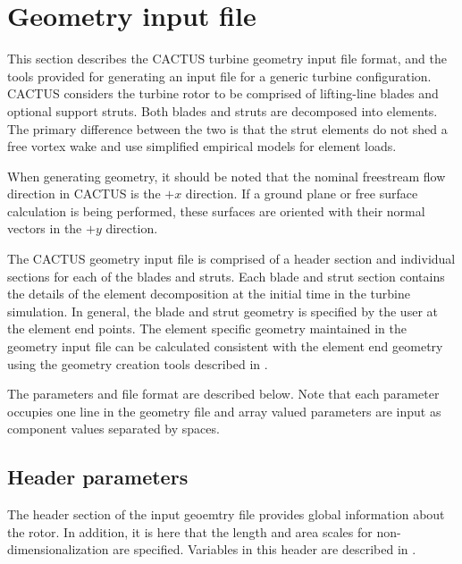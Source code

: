 \section{Geometry input file}
This section describes the CACTUS turbine geometry input file format, and the tools provided for generating an input file for a generic turbine configuration. CACTUS considers the turbine rotor to be comprised of lifting-line blades and optional support struts. Both blades and struts are decomposed into elements. The primary difference between the two is that the strut elements do not shed a free vortex wake and use simplified empirical models for element loads.

When generating geometry, it should be noted that the nominal freestream flow direction in CACTUS is the $+x$ direction. If a ground plane or free surface calculation is being performed, these surfaces are oriented with their normal vectors in the $+y$ direction.

The CACTUS geometry input file is comprised of a header section and individual sections for each of the blades and struts. Each blade and strut section contains the details of the element decomposition at the initial time in the turbine simulation. In general, the blade and strut geometry is specified by the user at the element end points. The element specific geometry maintained in the geometry input file can be calculated consistent with the element end geometry using the geometry creation tools described in . 

The parameters and file format are described below. Note that each parameter occupies one line in the geometry file and array valued parameters are input as component values separated by spaces.

\subsection{Header parameters}
The header section of the input geoemtry file provides global information about the rotor. In addition, it is here that the length and area scales for non-dimensionalization are specified. Variables in this header are described in .

